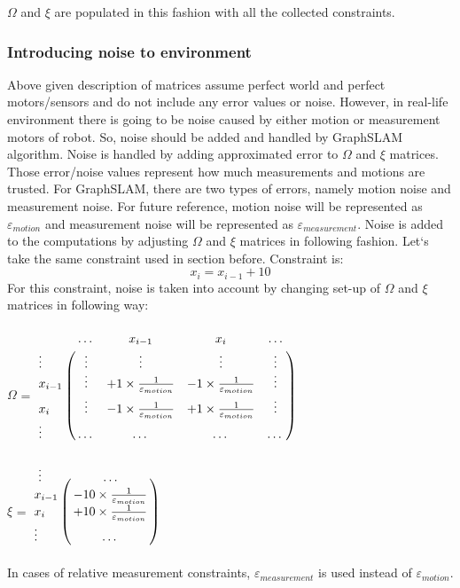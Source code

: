 \documentclass{ba-kecs}
\numberwithin{figure}{section}
\numberwithin{equation}{section}
\begin{document}
	$\Omega$ and $\xi$ are populated in this fashion with all the collected constraints.
	
\subsubsection{Introducing noise to environment}
Above given description of matrices assume perfect world and perfect motors/sensors and do not include any error values or noise. However, in real-life environment there is going to be noise caused by either motion or measurement motors of robot. So, noise should be added and handled by GraphSLAM algorithm. Noise is handled by adding approximated error to $\Omega$ and $\xi$ matrices. Those error/noise values represent how much measurements and motions are trusted. For GraphSLAM, there are two types of errors, namely motion noise and measurement noise. For future reference, motion noise will be represented as $\varepsilon_{motion}$ and measurement noise will be represented as $\varepsilon_{measurement}$. Noise is added to the computations by adjusting $\Omega$ and $\xi$ matrices in following fashion. Let`s take the same constraint used in section before. Constraint is:
\[ x_{i} = x_{i-1} + 10 \]
For this constraint, noise is taken into account by changing set-up of $\Omega$ and $\xi$ matrices in following way:\\ \\

$\Omega$ = $\bordermatrix{~ & \dots & x_{i-1} & x_{i} & \dots \cr
							\vdots & \vdots & \vdots & \vdots & \vdots \cr
                  			x_{i-1} & \vdots & +1 \times \frac{1}{\varepsilon_{motion}} & -1 \times \frac{1}{\varepsilon_{motion}} & \vdots \cr
                  			x_{i} & \vdots & -1 \times \frac{1}{\varepsilon_{motion}} & +1 \times \frac{1}{\varepsilon_{motion}} & \vdots \cr
                  			\vdots & \dots & \dots & \dots & \dots \cr}$ \\ \\
                  			
    $\xi$ = $\bordermatrix{~ \vdots & \dots \cr
                  			x_{i-1} & -10 \times \frac{1}{\varepsilon_{motion}} \cr
                  			x_{i}  & +10 \times \frac{1}{\varepsilon_{motion}} \cr
                  			\vdots & \dots \cr}$\\ \\
                  			
In cases of relative measurement constraints, $\varepsilon_{measurement}$ is used instead of $\varepsilon_{motion}$.
	
\end{document}
